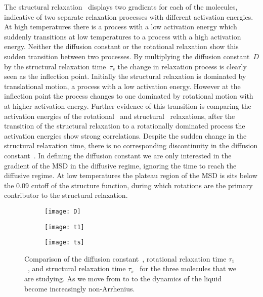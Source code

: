 The structural relaxation~ displays two gradients for each of the molecules, indicative of two separate relaxation processes with different activation energies. At high temperatures there is a process with a low activation energy which suddenly transitions at low temperatures to a process with a high activation energy. Neither the diffusion constant or the rotational relaxation show this sudden transition between two processes. By multiplying the diffusion constant~$D$ by the structural relaxation time~$\tau_s$  the change in relaxation process is clearly seen as the inflection point. Initially the structural relaxation is dominated by translational motion, a process with a low activation energy. However at the inflection point the process changes to one dominated by rotational motion with at higher activation energy. Further evidence of this transition is comparing the activation energies of the rotational~ and structural~ relaxations, after the transition of the structural relaxation to a rotationally dominated process the activation energies show strong correlations. Despite the sudden change in the structural relaxation time, there is no corresponding discontinuity in the diffusion constant~. In defining the diffusion constant we are only interested in the gradient of the MSD in the diffusive regime, ignoring the time to reach the diffusive regime. At low temperatures the plateau region of the MSD is sits below the 0.09 cutoff of the structure function, during which rotations are the primary contributor to the structural relaxation. 

\begin{figure}
    \centering
    \begin{subfigure}{\linewidth}
        \centering
        \texttt{[image: D]}
        \caption{}
        \label{fig:D}
    \end{subfigure}
    \begin{subfigure}{\linewidth}
        \centering
        \texttt{[image: t1]}
        \caption{}
        \label{fig:t1}
    \end{subfigure}
    \begin{subfigure}{\textwidth}
        \centering
        \texttt{[image: ts]}
        \caption{}
        \label{fig:ts}
    \end{subfigure}
    \caption{Comparison of the diffusion constant~, rotational relaxation time $\tau_1$~, and structural relaxation time $\tau_s$~ for the three molecules that we are studying. As we move from \done to \tri to \dcon the dynamics of the liquid become increasingly non-Arrhenius.}
    \label{fig:dynamic comparison}
\end{figure}


